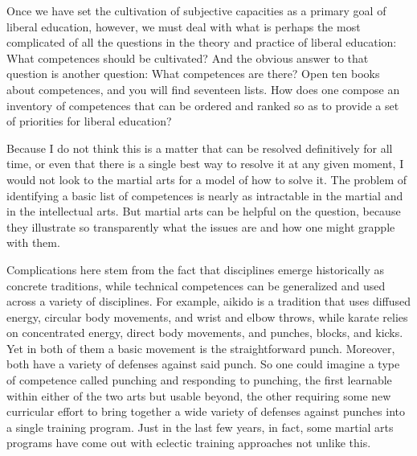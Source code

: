 Once we have set the cultivation of subjective capacities as a primary goal of liberal education, however, we must deal with what is perhaps the most complicated of all the questions in the theory and practice of liberal education: What competences should be cultivated? And the obvious answer to that question is another question: What competences are there? Open ten books about competences, and you will find seventeen lists. How does one compose an inventory of competences that can be ordered and ranked so as to provide a set of priorities for liberal education? 

Because I do not think this is a matter that can be resolved definitively for all time, or even that there is a single best way to resolve it at any given moment, I would not look to the martial arts for a model of how to solve it. The problem of identifying a basic list of competences is nearly as intractable in the martial and in the intellectual arts. But martial arts can be helpful on the question, because they illustrate so transparently what the issues are and how one might grapple with them.

Complications here stem from the fact that disciplines emerge historically as concrete traditions, while technical competences can be generalized and used across a variety of disciplines. For example, aikido is a tradition that uses diffused energy, circular body movements, and wrist and elbow throws, while karate relies on concentrated energy, direct body movements, and punches, blocks, and kicks. Yet in both of them a basic movement is the straightforward punch. Moreover, both have a variety of defenses against said punch. So one could imagine a type of competence called punching and responding to punching, the first learnable within either of the two arts but usable beyond, the other requiring some new curricular effort to bring together a wide variety of defenses against punches into a single training program. Just in the last few years, in fact, some martial arts programs have come out with eclectic training approaches not unlike this. 

